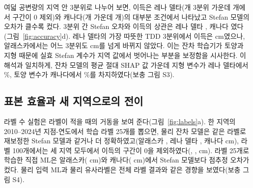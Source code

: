 여덟 공변량의 지역 안 3분위로 나누어 보면, 이득은 레나 델타(\ngcLecells{}개 3분위 가운데 \ngcLesig{}개에서 구간이 0 제외)와 캐나다(\ngcCacells{}개 가운데 \ngcCasig{}개)의 대부분 조건에서 나타났고 Stefan 모델의 오차가 클수록 컸다. 3분위 간 Stefan 오차와 이득의 상관은 레나 델타 \ngcLecorr, 캐나다 \ngcCacorr{}였다(그림~\ref{fig:accuracy}d). 레나 델타의 가장 따뜻한 TDD 3분위에서 이득은 \ndtddLewarm{} cm였으나, 알래스카에서는 어느 3분위도 \ngcAkmaxabs{} cm를 넘게 바뀌지 않았다. 이는 잔차 학습기가 토양과 지형 때문에 실효 Stefan 계수가 지역 값에서 벗어나는 부분을 보정함을 시사한다. 이 해석과 일치하게, 잔차 모델의 평균 절대 SHAP 값 가운데 지형 변수가 레나 델타에서 \nshapLeResTerrain\%, 토양 변수가 캐나다에서 \nshapCaResSoil\%를 차지하였다(보충 그림 S3).

\subsection{표본 효율과 새 지역으로의 전이}
라벨 수 실험은 라벨이 적을 때의 거동을 보여 준다(그림~\ref{fig:labels}a). 한 지역의 2010--2024년 지점-연도에서 학습 라벨 25개를 뽑으면, 물리 잔차 모델은 같은 라벨로 재보정한 Stefan 모델과 같거나 더 정확하였고(알래스카 \nllAkRotwfive, 레나 델타 \nllLeRotwfive, 캐나다 \nllCaRotwfive{} cm), 라벨 100개에서는 세 지역 모두에서 이득의 구간이 0을 제외하였다(\nllAkRohundred, \nllLeRohundred, \nllCaRohundred{} cm). 라벨 25개로 학습한 직접 ML은 알래스카(\nllAkDztwfive{} cm)와 캐나다(\nllCaDztwfive{} cm)에서 Stefan 모델보다 점추정 오차가 컸다. 물리 입력 ML과 물리 유사라벨은 전체 라벨 결과와 같은 경향을 보였다(보충 그림 S4).


